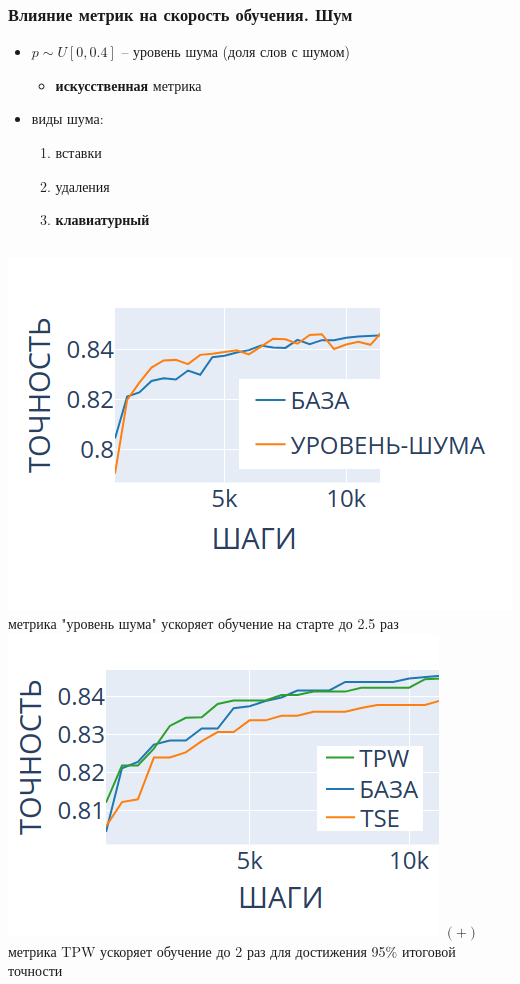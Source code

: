 \documentclass{beamer}
\begin{document}
\begin{frame}
	\frametitle{Влияние метрик на скорость обучения. Шум}
	\begin{itemize}
		\item $p \sim U[0, 0.4]$ -- уровень шума (доля слов с шумом)
			\begin{itemize}
				\item {\bf искусственная} метрика
			\end{itemize}
		\item виды шума:
			\begin{enumerate}
				\item вставки
				\item удаления
				\item {\bf клавиатурный}
			\end{enumerate}
	\end{itemize}
	\begin{columns}
		\includegraphics[scale=0.48]{keyboard_noise_level_short_prefix}
		метрика "уровень шума" ускоряет обучение на старте до 2.5 раз
		\includegraphics[scale=0.5]{keyboard_noise_TPW_win}
		{\bf\color{green}$(+)$} метрика TPW ускоряет обучение до 2 раз для достижения 95\% итоговой точности
	\end{columns}
\end{frame}
\end{document}
